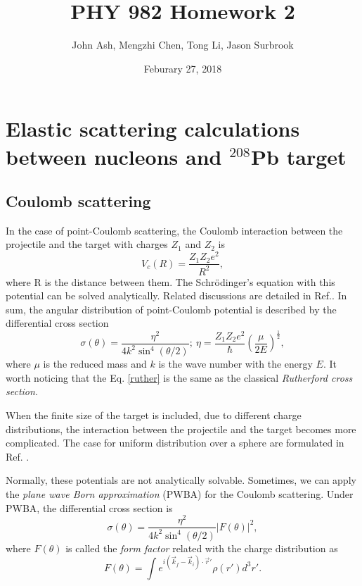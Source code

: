 \documentclass[12pt]{article}
\title{PHY 982 Homework 2}
\author{John Ash, Mengzhi Chen, Tong Li, Jason Surbrook}
\date{Feburary 27, 2018}
\begin{document}
\maketitle

\section{Elastic scattering calculations between nucleons and $^{208}$Pb target}
\subsection{Coulomb scattering}
	In the case of point-Coulomb scattering, the Coulomb interaction between the projectile and the target with charges $Z_1$ and $Z_2$ is 
	\begin{equation}
		V_c(R)=\frac{Z_1Z_2e^2}{R^2},
	\end{equation}
	where R is the distance between them. The Schr\"{o}dinger's equation with this potential can be solved analytically. Related discussions are detailed in Ref.\cite{thompson2009nuclear}. In sum, the angular distribution of point-Coulomb potential is described by the differential cross section
	\begin{equation}\label{ruther}
		\sigma(\theta)=\frac{\eta^2}{4k^2\sin^4(\theta/2)};\ \eta=\frac{Z_1Z_2e^2}{\hbar}\left(\frac{\mu}{2E}\right)^{\frac{1}{2}},
	\end{equation} 
	where $\mu$ is the reduced mass and $k$ is the wave number with the energy $E$. It worth noticing that the Eq. \ref{ruther} is the same as the classical \emph{Rutherford cross section}.
	
	When the finite size of the target is included, due to different charge distributions, the interaction between the projectile and the target becomes more complicated. The case for uniform distribution over a sphere are formulated in Ref.  \cite{thompson2009nuclear}.
	
  		Normally, these potentials are not analytically solvable. Sometimes, we can apply the \emph{plane wave Born approximation} (PWBA) for the Coulomb scattering. Under PWBA, the differential cross section is 
  	\begin{equation}\label{ruther}
	\sigma(\theta)=\frac{\eta^2}{4k^2\sin^4(\theta/2)}\left|F(\theta)\right|^2,\end{equation}
	where $F(\theta)$ is called the \emph{form factor} related with the charge distribution as
	\begin{equation}
	F(\theta) = \int e^{i(\vec{k}_f-\vec{k}_i)\cdot\vec{r}'}\rho(r')d^3r'.
	\end{equation}
	
\end{document}
